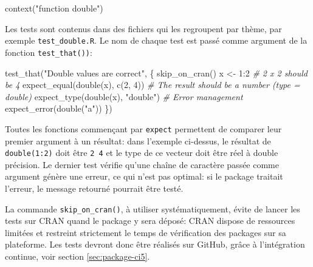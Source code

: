 \documentclass[
  11pt,
  french,
  a4paper,
  extrafontsizes,onecolumn,openright
  ]{memoir}
\newenvironment{Shaded}{\begin{snugshade}}{\end{snugshade}}
\newcommand{\CommentTok}[1]{\textcolor[rgb]{0.56,0.35,0.01}{\textit{#1}}}
\newcommand{\DecValTok}[1]{\textcolor[rgb]{0.00,0.00,0.81}{#1}}
\newcommand{\FunctionTok}[1]{\textcolor[rgb]{0.00,0.00,0.00}{#1}}
\newcommand{\NormalTok}[1]{#1}
\newcommand{\OtherTok}[1]{\textcolor[rgb]{0.56,0.35,0.01}{#1}}
\newcommand{\SpecialCharTok}[1]{\textcolor[rgb]{0.00,0.00,0.00}{#1}}
\newcommand{\StringTok}[1]{\textcolor[rgb]{0.31,0.60,0.02}{#1}}
\begin{document}
\scriptsize

\begin{Shaded}
\begin{Highlighting}[]
\FunctionTok{context}\NormalTok{(}\StringTok{"function double"}\NormalTok{)}
\end{Highlighting}
\end{Shaded}

\normalsize

Les tests sont contenus dans des fichiers qui les regroupent par thème, par exemple \texttt{test\_double.R}.
Le nom de chaque test est passé comme argument de la fonction \texttt{test\_that())}:

\scriptsize

\begin{Shaded}
\begin{Highlighting}[]
\FunctionTok{test\_that}\NormalTok{(}\StringTok{"Double values are correct"}\NormalTok{, \{}
    \FunctionTok{skip\_on\_cran}\NormalTok{()}
\NormalTok{    x }\OtherTok{\textless{}{-}} \DecValTok{1}\SpecialCharTok{:}\DecValTok{2}
    \CommentTok{\# 2 x 2 should be 4}
    \FunctionTok{expect\_equal}\NormalTok{(}\FunctionTok{double}\NormalTok{(x), }\FunctionTok{c}\NormalTok{(}\DecValTok{2}\NormalTok{, }\DecValTok{4}\NormalTok{))}
    \CommentTok{\# The result should be a number (type = \textquotesingle{}double\textquotesingle{})}
    \FunctionTok{expect\_type}\NormalTok{(}\FunctionTok{double}\NormalTok{(x), }\StringTok{"double"}\NormalTok{)}
    \CommentTok{\# Error management}
    \FunctionTok{expect\_error}\NormalTok{(}\FunctionTok{double}\NormalTok{(}\StringTok{"a"}\NormalTok{))}
\NormalTok{\})}
\end{Highlighting}
\end{Shaded}

\normalsize

Toutes les fonctions commençant par \texttt{expect} permettent de comparer leur premier argument à un résultat: dans l'exemple ci-dessus, le résultat de \texttt{double(1:2)} doit être \texttt{2\ 4} et le type de ce vecteur doit être réel à double précision.
Le dernier test vérifie qu'une chaîne de caractère passée comme argument génère une erreur, ce qui n'est pas optimal: si le package traitait l'erreur, le message retourné pourrait être testé.

La commande \texttt{skip\_on\_cran()}, à utiliser systématiquement, évite de lancer les tests sur CRAN quand le package y sera déposé: CRAN dispose de ressources limitées et restreint strictement le temps de vérification des packages sur sa plateforme.
Les tests devront donc être réalisés sur GitHub, grâce à l'intégration continue, voir section \ref{sec:package-ci5}.
\end{document}
